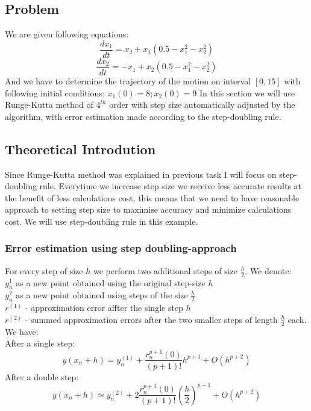 \documentclass[12pt]{report}
\begin{document}
\subsection{Problem}
We are given following equations:
\[ \frac{dx_1}{dt} = x_2 + x_1(0.5 - x_1^2 - x_2^2) \]
\[ \frac{dx_2}{dt} = -x_1 + x_2(0.5 - x_1^2 - x_2^2) \]
And we have to determine the trajectory of the motion on interval $[0, 15]$ with following initial conditions:
$ x_1(0) = 8; x_2(0) = 9 $
In this section we will use Runge-Kutta method of $4^{th}$ order with step size automatically adjusted by the algorithm, with error estimation made according to the step-doubling rule.
\subsection{Theoretical Introdution}
Since Runge-Kutta method was explained in previous task I will focus on step-doubling rule.
Everytime we increase step size we receive less accurate results at the benefit of less calculations cost, this means that we need to have reasonable approach to setting step size to maximise accuracy and minimize calculations cost. We will use step-doubling rule in this example.

\subsubsection{Error estimation using step doubling-approach}
For every step of size $h$ we perform two additional steps of size $\frac{h}{2}$. We denote: \\
$y_n^{1}$ as a new point obtained using the original step-size $h$ \\
$y_n^{2}$ as a new point obtained using steps of the size $\frac{h}{2}$ \\
$r^{(1)}$ - approximation error affter the single step $h$ \\
$r^{(2)}$ - summed approximation errors after the two smaller steps of length $\frac{h}{2}$ each. \\
We have: \\
\newpage
After a single step:
\[ y(x_n + h) = y_n^{(1)} + \frac{r_n^{p+1}(0)}{(p+1)!}h^{p+1} + O(h^{p+2}) \]
After a double step:
\[  y(x_n+h) \simeq y_n^{(2)} + 2\frac{r_n^{p+1}(0)}{(p+1)!}(\frac{h}{2})^{p+1} + O(h^{p+2}) \]
\end{document}
